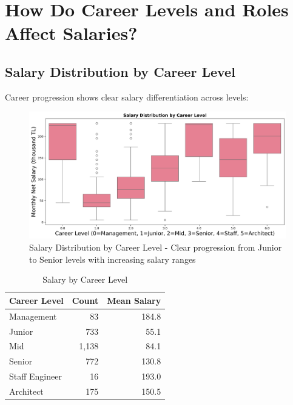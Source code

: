 \documentclass[12pt,a4paper]{article}
\begin{document}
\section{How Do Career Levels and Roles Affect Salaries?}

\subsection{Salary Distribution by Career Level}
Career progression shows clear salary differentiation across levels:

\begin{figure}[H]
    \centering
    \includegraphics[width=\textwidth]{figures/boxplot_seniority.png}
    \caption{Salary Distribution by Career Level - Clear progression from Junior to Senior levels with increasing salary ranges}
\end{figure}

\begin{table}[H]
\centering
\begin{tabular}{lrr}
\toprule
\textbf{Career Level} & \textbf{Count} & \textbf{Mean Salary} \\
\midrule
Management & 83 & 184.8 \\
Junior & 733 & 55.1 \\
Mid & 1,138 & 84.1 \\
Senior & 772 & 130.8 \\
Staff Engineer & 16 & 193.0 \\
Architect & 175 & 150.5 \\

\bottomrule
\end{tabular}
\caption{Salary by Career Level}
\end{table}
\end{document}
